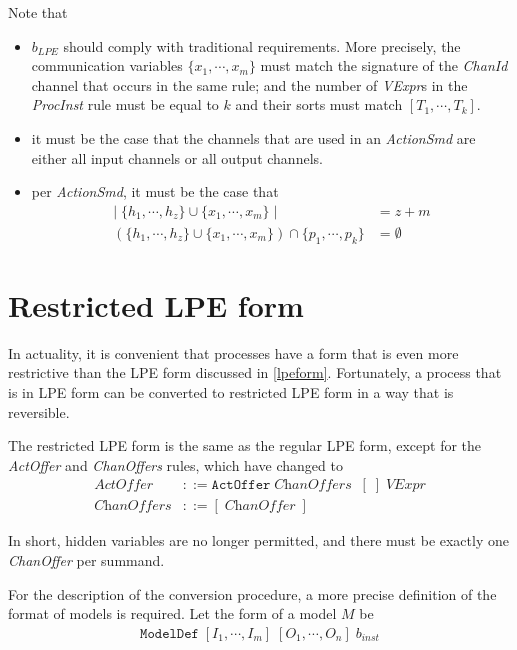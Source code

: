 Note that
\begin{itemize}
\item $b_\textit{LPE}$ should comply with traditional \txs{} requirements.
More precisely, the communication variables $\{ x_1, \cdots{}, x_m \}$ must match the signature of the \textit{ChanId} channel that occurs in the same rule; and the number of \textit{VExpr}s in the \textit{ProcInst} rule must be equal to $k$ and their sorts must match $[T_1, \cdots{}, T_k]$.
\item it must be the case that the channels that are used in an \textit{ActionSmd} are either all input channels or all output channels.
\item per \textit{ActionSmd}, it must be the case that
\begin{align*}
|\; \{ h_1, \cdots{}, h_z \} \cup \{ x_1, \cdots{}, x_m \} \; | &= z + m \\
(\{ h_1, \cdots{}, h_z \} \cup \{ x_1, \cdots{}, x_m \}) \cap \{ p_1, \cdots{}, p_k \} &= \emptyset{}
\end{align*}
\end{itemize}

\section{Restricted LPE form} \label{restrictedlpeform}

In actuality, it is convenient that processes have a form that is even more restrictive than the LPE form discussed in \ref{lpeform}.
Fortunately, a process that is in LPE form can be converted to restricted LPE form in a way that is reversible.

The restricted LPE form is the same as the regular LPE form, except for the \textit{ActOffer} and \textit{ChanOffers} rules, which have changed to
\begin{align*}
\textit{ActOffer} &::= \texttt{ActOffer} \; \textit{ChanOffers} \;\; [\;] \; \textit{VExpr} \\
\textit{ChanOffers} &::= [ \;\! \textit{ChanOffer} \; ]
\end{align*}

In short, hidden variables are no longer permitted, and there must be exactly one \textit{ChanOffer} per summand.

For the description of the conversion procedure, a more precise definition of the format of \txs{} models is required.
Let the form of a \txs{} model $M$ be
\begin{align*}
\texttt{ModelDef} \; [I_1, \cdots{}, I_m] \; [O_1, \cdots{}, O_n] \; b_\textit{inst}
\end{align*}

